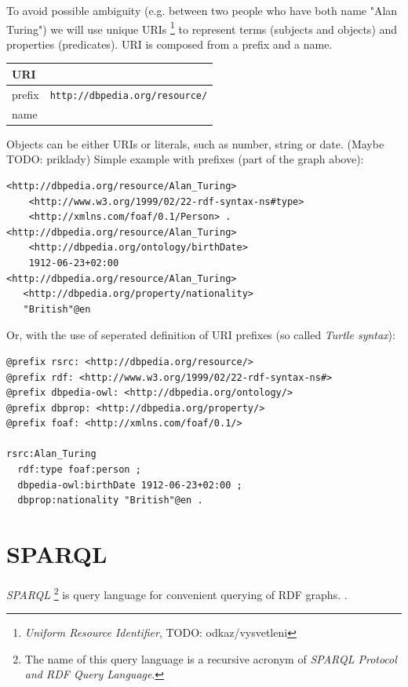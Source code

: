 \documentclass[a4paper, 12pt, twoside]{fithesis2}		%
\renewcommand{\_}{\leavevmode \kern0.0em\vbox{\hrule width0.4em}}
\begin{document}
To avoid possible ambiguity (e.g. between two people who have both name "Alan Turing")
we will use unique URIs%
\footnote{\emph{Uniform Resource Identifier}, TODO: odkaz/vysvetleni}
to represent terms (subjects and objects) and properties (predicates).
URI is composed from a prefix and a name.

\begin{tabular}{ l  l }
  URI & \texttt{http://dbpedia.org/resource/Alan\_Turing}\\
  \hline
  prefix & \texttt{http://dbpedia.org/resource/}\\
  name & \texttt{Alan\_Turing}\\
\end{tabular}

\noindent
Objects can be either URIs or literals, such as number, string or date. (Maybe TODO: priklady)
Simple example with prefixes (part of the graph above):

\begin{verbatim}
<http://dbpedia.org/resource/Alan_Turing>
    <http://www.w3.org/1999/02/22-rdf-syntax-ns#type>
    <http://xmlns.com/foaf/0.1/Person> .
<http://dbpedia.org/resource/Alan_Turing>
    <http://dbpedia.org/ontology/birthDate>
    1912-06-23+02:00
<http://dbpedia.org/resource/Alan_Turing>
   <http://dbpedia.org/property/nationality>
   "British"@en
\end{verbatim}

Or, with the use of seperated definition of URI prefixes (so called \emph{Turtle syntax}):

\begin{verbatim}
@prefix rsrc: <http://dbpedia.org/resource/>
@prefix rdf: <http://www.w3.org/1999/02/22-rdf-syntax-ns#>
@prefix dbpedia-owl: <http://dbpedia.org/ontology/>
@prefix dbprop: <http://dbpedia.org/property/>
@prefix foaf: <http://xmlns.com/foaf/0.1/>

rsrc:Alan_Turing
  rdf:type foaf:person ;
  dbpedia-owl:birthDate 1912-06-23+02:00 ;
  dbprop:nationality "British"@en .
\end{verbatim}

\section{SPARQL}
\label{sec:sparql}

\textit{SPARQL}%
\footnote{The name of this query language is a recursive acronym of \textit{SPARQL Protocol and RDF Query Language}.}
is query language for convenient querying of RDF graphs. \parencite[][84]{semantic-web}.
\end{document}
